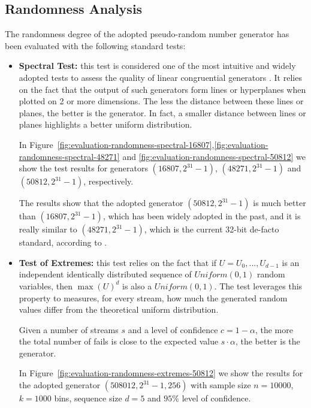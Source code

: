 \subsection{Randomness Analysis}
\label{sec:evaluation-randomness-analysis}
The randomness degree of the adopted pseudo-random number generator has been evaluated with the following standard tests:

\begin{itemize}
	\item \textbf{Spectral Test:} this test is considered one of the most intuitive and widely adopted tests to assess the quality of linear congruential generators \cite{knuth1981art}. 
	It relies on the fact that the output of such generators form lines or hyperplanes when plotted on 2 or more dimensions. The less the distance between these lines or planes, the better is the generator. 
	In fact, a smaller distance between lines or planes highlights a better uniform distribution.
	
	In Figure~\ref{fig:evaluation-randomness-spectral-16807},\ref{fig:evaluation-randomness-spectral-48271} and \ref{fig:evaluation-randomness-spectral-50812} we show the test results for generators $(16807,2^{31}-1)$, $(48271,2^{31}-1)$ and $(50812,2^{31}-1)$, respectively.

	The results show that the adopted generator $(50812,2^{31}-1)$ is much better than $(16807, 2^{31}-1)$, which has been widely adopted in the past, and it is really similar to $(48271,2^{31}-1)$, which is the current 32-bit de-facto standard, according to \cite{leemis2006discrete}.
	
	\item \textbf{Test of Extremes:} this test relies on the fact that if $U=U_{0},...,U_{d-1}$ is an independent identically distributed sequence of $Uniform(0,1)$ random variables, then $\max(U)^{d}$ is also a $Uniform(0,1)$. The test leverages this property to measures, for every stream, how much the generated random values differ from the theoretical uniform distribution.
	
	Given a number of streams $s$ and a level of confidence $c=1-\alpha$, the more the total number of fails is close to the expected value $s \cdot \alpha$, the better is the generator.
	
	In Figure~\ref{fig:evaluation-randomness-extremes-50812} we show the results for the adopted generator $(508012,2^{31}-1, 256)$ with sample size $n=10000$, $k=1000$ bins, sequence size $d=5$ and $95\%$ level of confidence.
	

\end{itemize}
